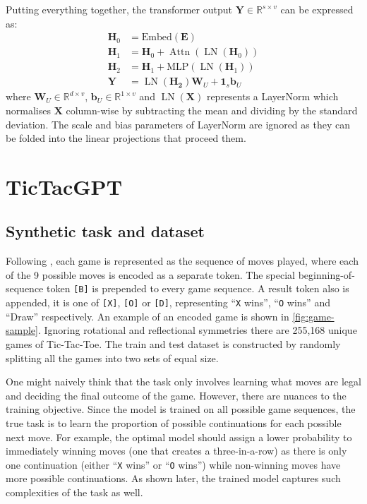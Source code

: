\documentclass{article}
\newcommand{\ttgpt}{TicTacGPT\xspace}
\newcommand{\ttt}{Tic-Tac-Toe\xspace}
\renewcommand{\v}[1]{\mathbf{\bm{#1}}}
\newcommand{\m}[1]{\mathbf{\bm{#1}}}
\newcommand{\R}{\mathbb{R}}
\DeclareMathOperator{\layernorm}{LN}
\DeclareMathOperator{\attn}{Attn}
\begin{document}
Putting everything together, the transformer output $\m{Y} \in \R^{s \times v}$ can be expressed as:
\begin{equation}  \label{eq:transformer}
    \begin{aligned}
        \m{H}_0 & = \text{Embed}(\m{E})                           \\
        \m{H}_1 & = \m{H}_0 + \attn(\layernorm(\m{H}_0))          \\
        \m{H}_2 & = \m{H}_1 + \text{MLP}(\layernorm(\m{H}_1))     \\
        \m{Y}   & = \layernorm(\m{H_2}) \m{W}_U + \v{1}_s \v{b}_U
    \end{aligned}
\end{equation}
where $\m{W}_U \in \R^{d \times v}$, $\v{b}_U \in \R ^{1 \times v}$ and $\layernorm(\m{X})$ represents a LayerNorm which normalises $\m{X}$ column-wise by subtracting the mean and dividing by the standard deviation. The scale and bias parameters of LayerNorm are ignored as they can be folded into the linear projections that proceed them.

\section{\ttgpt}

\subsection{Synthetic task and dataset}



Following \cite{orthello-gpt}, each game is represented as the sequence of moves played, where each of the 9 possible moves is encoded as a separate token. The special beginning-of-sequence token \texttt{[B]} is prepended to every game sequence. A result token also is appended, it is one of \texttt{[X]}, \texttt{[O]} or \texttt{[D]}, representing ``\texttt{X} wins'', ``\texttt{O} wins'' and ``Draw'' respectively. An example of an encoded game is shown in \cref{fig:game-sample}. Ignoring rotational and reflectional symmetries there are 255,168 unique games of \ttt. The train and test dataset is constructed by randomly splitting all the games into two sets of equal size.

One might naively think that the task only involves learning what moves are legal and deciding the final outcome of the game. However, there are nuances to the training objective. Since the model is trained on all possible game sequences, the true task is to learn the proportion of possible continuations for each possible next move. For example, the optimal model should assign a lower probability to immediately winning moves (one that creates a three-in-a-row) as there is only one continuation (either ``\texttt{X} wins'' or ``\texttt{O} wins'') while non-winning moves have more possible continuations. As shown later, the trained model captures such complexities of the task as well.
\end{document}
